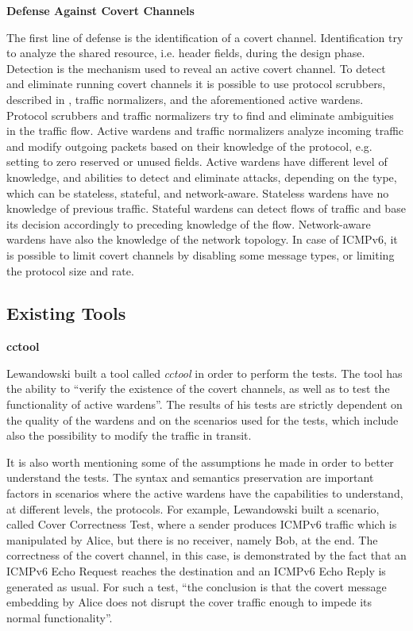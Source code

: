 \documentclass[12pt]{article}
\begin{document}
\textbf{Defense Against Covert Channels}

The first line of defense is the identification of a covert channel. Identification try to analyze the shared resource, i.e. header fields, during the design phase. Detection is the mechanism used to reveal an active covert channel. To detect and eliminate running covert channels it is possible to use protocol scrubbers, described in \cite{protocolScrubbers}, traffic normalizers, and the aforementioned active wardens. Protocol scrubbers and traffic normalizers try to find and eliminate ambiguities in the traffic flow. Active wardens and traffic normalizers analyze incoming traffic and modify outgoing packets based on their knowledge of the protocol, e.g. setting to zero reserved or unused fields. Active wardens have different level of knowledge, and abilities to detect and eliminate attacks, depending on the type, which can be stateless, stateful, and network-aware. Stateless wardens have no knowledge of previous traffic. Stateful wardens can detect flows of traffic and base its decision accordingly to preceding knowledge of the flow. Network-aware wardens have also the knowledge of the network topology. In case of ICMPv6, it is possible to limit covert channels by disabling some message types, or limiting the protocol size and rate\cite{milevaPanajotov}.

\subsection{Existing Tools}
\label{sub:tools}

\textbf{cctool}

Lewandowski built a tool called \textit{cctool} in order to perform the tests. The tool has the ability to ``verify the existence of the covert channels, as well as to test the functionality of active wardens''. The results of his tests are strictly dependent on the quality of the wardens and on the scenarios used for the tests, which include also the possibility to modify the traffic in transit\cite{lewandowski}.

It is also worth mentioning some of the assumptions he made in order to better understand the tests. The syntax and semantics preservation are important factors in scenarios where the active wardens have the capabilities to understand, at different levels, the protocols. For example, Lewandowski built a scenario, called Cover Correctness Test, where a sender produces ICMPv6 traffic which is manipulated by Alice, but there is no receiver, namely Bob, at the end. The correctness of the covert channel, in this case, is demonstrated by the fact that an ICMPv6 Echo Request reaches the destination and an ICMPv6 Echo Reply is generated as usual. For such a test, ``the conclusion is that the covert message embedding by Alice does not disrupt the cover traffic enough to impede its normal functionality''\cite{lewandowski}.
\end{document}
